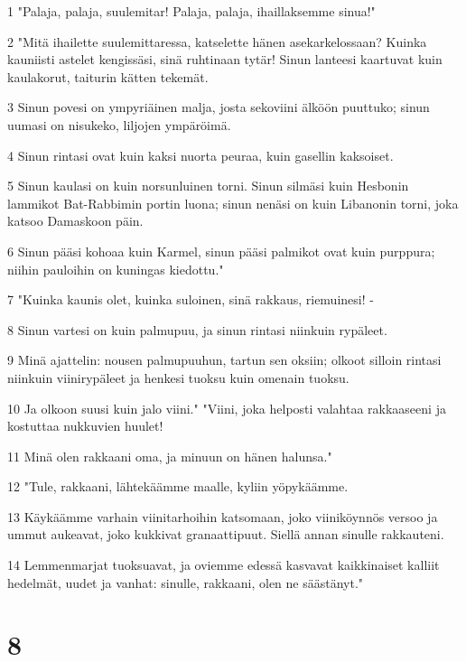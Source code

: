 \par 1 "Palaja, palaja, suulemitar! Palaja, palaja, ihaillaksemme sinua!"
\par 2 "Mitä ihailette suulemittaressa, katselette hänen asekarkelossaan? Kuinka kauniisti astelet kengissäsi, sinä ruhtinaan tytär! Sinun lanteesi kaartuvat kuin kaulakorut, taiturin kätten tekemät.
\par 3 Sinun povesi on ympyriäinen malja, josta sekoviini älköön puuttuko; sinun uumasi on nisukeko, liljojen ympäröimä.
\par 4 Sinun rintasi ovat kuin kaksi nuorta peuraa, kuin gasellin kaksoiset.
\par 5 Sinun kaulasi on kuin norsunluinen torni. Sinun silmäsi kuin Hesbonin lammikot Bat-Rabbimin portin luona; sinun nenäsi on kuin Libanonin torni, joka katsoo Damaskoon päin.
\par 6 Sinun pääsi kohoaa kuin Karmel, sinun pääsi palmikot ovat kuin purppura; niihin pauloihin on kuningas kiedottu."
\par 7 "Kuinka kaunis olet, kuinka suloinen, sinä rakkaus, riemuinesi! -
\par 8 Sinun vartesi on kuin palmupuu, ja sinun rintasi niinkuin rypäleet.
\par 9 Minä ajattelin: nousen palmupuuhun, tartun sen oksiin; olkoot silloin rintasi niinkuin viinirypäleet ja henkesi tuoksu kuin omenain tuoksu.
\par 10 Ja olkoon suusi kuin jalo viini." "Viini, joka helposti valahtaa rakkaaseeni ja kostuttaa nukkuvien huulet!
\par 11 Minä olen rakkaani oma, ja minuun on hänen halunsa."
\par 12 "Tule, rakkaani, lähtekäämme maalle, kyliin yöpykäämme.
\par 13 Käykäämme varhain viinitarhoihin katsomaan, joko viiniköynnös versoo ja ummut aukeavat, joko kukkivat granaattipuut. Siellä annan sinulle rakkauteni.
\par 14 Lemmenmarjat tuoksuavat, ja oviemme edessä kasvavat kaikkinaiset kalliit hedelmät, uudet ja vanhat: sinulle, rakkaani, olen ne säästänyt."

\chapter{8}

